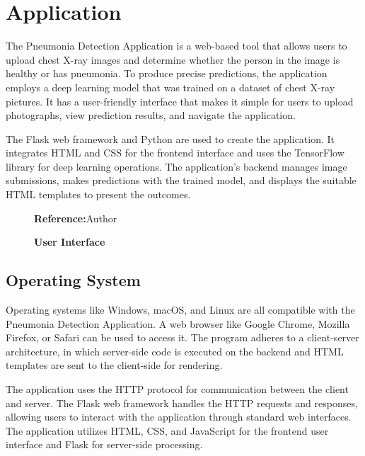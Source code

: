 %
%
%
	
\chapter{Application}

The Pneumonia Detection Application is a web-based tool that allows users to upload chest X-ray images and determine whether the person in the image is healthy or has pneumonia.  To produce precise predictions, the application employs a deep learning model that was trained on a dataset of chest X-ray pictures. It has a user-friendly interface that makes it simple for users to upload photographs, view prediction results, and navigate the application.
\smallskip

The Flask web framework and Python are used to create the application. It integrates HTML and CSS for the frontend interface and uses the TensorFlow library for deep learning operations. The application's backend manages image submissions, makes predictions with the trained model, and displays the suitable HTML templates to present the outcomes.

\begin{figure}
	\centering
	\caption{\textbf{User Interface}}
	\footnotesize \textbf{Reference:}Author
	\label{fig:User Interface}
\end{figure}

\section{Operating System}

Operating systems like Windows, macOS, and Linux are all compatible with the Pneumonia Detection Application. A web browser like Google Chrome, Mozilla Firefox, or Safari can be used to access it. The program adheres to a client-server architecture, in which server-side code is executed on the backend and HTML templates are sent to the client-side for rendering.
\smallskip

The application uses the HTTP protocol for communication between the client and server. The Flask web framework handles the HTTP requests and responses, allowing users to interact with the application through standard web interfaces. The application utilizes HTML, CSS, and JavaScript for the frontend user interface and Flask for server-side processing.

